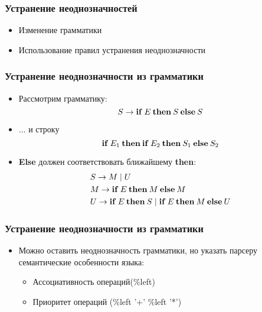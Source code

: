 \documentclass[16pt,pdf,unicode]{beamer}
\begin{document}
\begin{frame}
\frametitle{Устранение неоднозначностей}
\begin{itemize}
  \item Изменение грамматики
  \item Использование правил устранения неоднозначности
\end{itemize}
\end{frame}

\begin{frame}
\frametitle{Устранение неоднозначности из грамматики}
\begin{itemize}
  \item Рассмотрим грамматику:
  $$ S \rightarrow \bold{if} \: E \: \bold{then} \: S \: \bold{else} \: S $$
  \item ... и строку
  $$ \bold{if} \: E_1 \: \bold{then} \: \bold{if} \: E_2 \: \bold{then} \: S_1 \: \bold{else} \: S_2 $$
  \item \textbf{Else} должен соответствовать ближайшему \textbf{then}:
  \begin{align*}
    & S \rightarrow M \mid U \\ 
    & M \rightarrow \bold{if} \: E \: \bold{then} \: M \: \bold{else} \: M \\
    & U \rightarrow \bold{if} \: E \: \bold{then} \: S \mid 
        \bold{if} \: E \: \bold{then} \: M \: \bold{else} \: U
  \end{align*}
\end{itemize}
\end{frame}

\begin{frame}
\frametitle{Устранение неоднозначности из грамматики}
\begin{itemize}
  \item Можно оставить неоднозначность грамматики, но указать парсеру семантические особенности языка:
    \begin{itemize}
      \item Ассоциативность операций(\%left)
      \item Приоритет операций (\%left '+' \%left '*')
    \end{itemize}
\end{itemize}
\end{frame}
\end{document}
